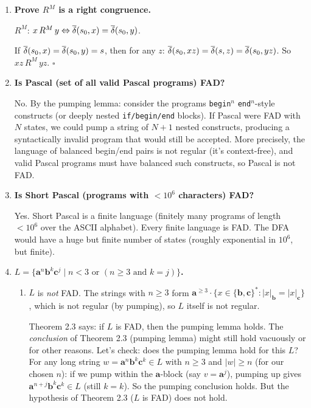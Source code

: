 \begin{enumerate}[{2.}1.]
\begin{enumerate}
\item Minimal DFA: 8 states (one per class), with transitions determined by appending $\mathbf{a}$ or $\mathbf{b}$ and seeing which class the result falls into.
\end{enumerate}

\item \textbf{Prove $R^M$ is a right congruence.}

$R^M$: $x\,R^M\,y\Leftrightarrow\overline{\delta}(s_0,x)=\overline{\delta}(s_0,y)$.

If $\overline{\delta}(s_0,x)=\overline{\delta}(s_0,y)=s$, then for any $z$: $\overline{\delta}(s_0,xz)=\overline{\delta}(s,z)=\overline{\delta}(s_0,yz)$. So $xz\,R^M\,yz$. $\square$

\item \textbf{Is Pascal (set of all valid Pascal programs) FAD?}

No. By the pumping lemma: consider the programs \texttt{begin}$^n$ \texttt{end}$^n$-style constructs (or deeply nested \texttt{if/begin/end} blocks). If Pascal were FAD with $N$ states, we could pump a string of $N+1$ nested constructs, producing a syntactically invalid program that would still be accepted. More precisely, the language of balanced begin/end pairs is not regular (it's context-free), and valid Pascal programs must have balanced such constructs, so Pascal is not FAD.

\item \textbf{Is Short Pascal (programs with $<10^6$ characters) FAD?}

Yes. Short Pascal is a finite language (finitely many programs of length $<10^6$ over the ASCII alphabet). Every finite language is FAD. The DFA would have a huge but finite number of states (roughly exponential in $10^6$, but finite).

\item \textbf{$L=\{\mathbf{a}^n\mathbf{b}^k\mathbf{c}^j\mid n<3\text{ or }(n\geq 3\text{ and }k=j)\}$.}

\begin{enumerate}
\item $L$ is \emph{not} FAD. The strings with $n\geq 3$ form $\mathbf{a}^{\geq 3}\cdot\{x\in\{\mathbf{b},\mathbf{c}\}^*:|x|_\mathbf{b}=|x|_\mathbf{c}\}$, which is not regular (by pumping), so $L$ itself is not regular.

Theorem 2.3 says: if $L$ is FAD, then the pumping lemma holds. The \emph{conclusion} of Theorem 2.3 (pumping lemma) might still hold vacuously or for other reasons. Let's check: does the pumping lemma hold for this $L$? For any long string $w=\mathbf{a}^n\mathbf{b}^k\mathbf{c}^k\in L$ with $n\geq 3$ and $|w|\geq n$ (for our chosen $n$): if we pump within the $\mathbf{a}$-block (say $v=\mathbf{a}^j$), pumping up gives $\mathbf{a}^{n+j}\mathbf{b}^k\mathbf{c}^k\in L$ (still $k=k$). So the pumping conclusion holds. But the hypothesis of Theorem 2.3 ($L$ is FAD) does not hold.


\end{enumerate}
\end{enumerate}
